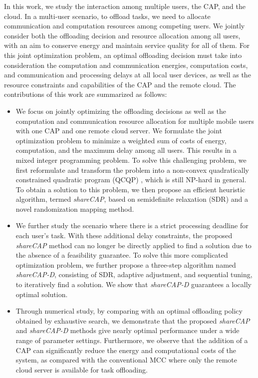 \documentclass[10pt,journal,compsoc]{IEEEtran}
\begin{document}
In this work, we study the interaction among multiple users, the
CAP, and the cloud.
In a multi-user scenario, to offload tasks, we need to allocate
communication and computation resources among competing users. We
jointly consider both the offloading decision and resource
allocation among all users, with an aim to conserve energy and
maintain service quality for all of them. For this joint
optimization problem, an optimal offloading decision must take into
consideration the computation and communication energies,
computation costs, and communication and processing delays at all
local user devices, as well as the resource constraints and
capabilities of the CAP and the remote cloud. The contributions of
this work are summarized as follows:
\begin{itemize}
\item We focus on jointly
optimizing the offloading decisions as well as the computation and
communication resource allocation for multiple mobile users with one
CAP and one remote cloud server. We formulate the joint optimization
problem to minimize a weighted sum of costs of energy, computation,
and the maximum delay among all users. This results in a mixed
integer programming problem. To solve this challenging problem, we
first reformulate and transform the problem into a non-convex
quadratically constrained quadratic program (QCQP) \cite{boyd2004},
which is still NP-hard in general.
 To obtain a solution to this problem, we then propose an efficient heuristic
algorithm, termed \textit{shareCAP}, based on semidefinite
relaxation (SDR) \cite{luo2010} and a novel randomization mapping
method.

\item We further study the scenario where there is a strict processing deadline for each user's task.
With these additional delay constraints, the proposed
\textit{shareCAP} method can no longer be directly applied to find a
solution due to the absence of a feasibility guarantee.
 To solve this more complicated optimization problem, we further propose a three-step
algorithm named \textit{shareCAP-D}, consisting of SDR, adaptive
adjustment, and sequential tuning, to iteratively find a solution.
We show that \textit{shareCAP-D}
guarantees a locally optimal solution.

\item Through numerical study, by comparing with an
optimal offloading policy obtained by exhaustive search, we
demonstrate that the proposed \textit{shareCAP} and
\textit{shareCAP-D} methods give nearly optimal performance under a
wide range of parameter settings. Furthermore, we observe that the
addition of a CAP can significantly reduce the energy and
computational costs of the system, as
compared with the conventional MCC where only the remote cloud
server is available for task offloading.
\end{itemize}
%
\end{document}
